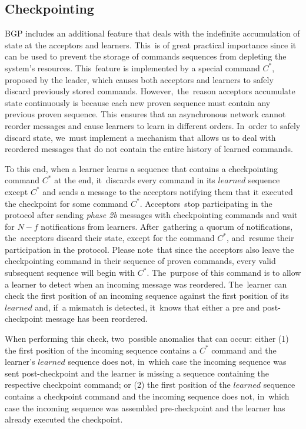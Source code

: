 \documentclass[algorithms,article,accept,moreauthors,pdftex,10pt,a4paper]{Definitions/mdpi}
\begin{document}
\subsection{Checkpointing} BGP includes an additional feature that deals with the indefinite accumulation of state at the acceptors and learners. This~is of great practical importance since it can be used to prevent the storage of commands sequences from depleting the system's resources. This~feature is implemented by a special command $C^*$, proposed by the leader, which causes both acceptors and learners to safely discard previously stored commands. However,~the~reason acceptors accumulate state continuously is because each new proven sequence must contain any previous proven sequence. This~ensures that an asynchronous network cannot reorder messages and cause learners to learn in different orders. In~order to safely discard state, we~must implement a mechanism that allows us to deal with reordered messages that do not contain the entire history of learned commands.\par
To this end, when a learner learns a sequence that contains a checkpointing command $C^*$ at the end, it~discards every command in its $learned$ sequence except $C^*$ and sends a message to the acceptors notifying them that it executed the checkpoint for some command $C^*$. Acceptors~stop participating in the protocol after sending \textit{phase 2b} messages with checkpointing commands and wait for $N-f$ notifications from learners. After~gathering a quorum of notifications, the~acceptors discard their state, except for the command $C^*$, and~resume their participation in the protocol. Please note~that since the acceptors also leave the checkpointing command in their sequence of proven commands, every valid subsequent sequence will begin with $C^*$. The~purpose of this command is to allow a learner to detect when an incoming message was reordered. The~learner can check the first position of an incoming sequence against the first position of its $learned$ and, if~a mismatch is detected, it~knows that either a pre and post-checkpoint message has been reordered. \par
When performing this check, two~possible anomalies that can occur: either (1) the first position of the incoming sequence contains a $C^*$ command and the learner's $learned$ sequence does not, in~which case the incoming sequence was sent post-checkpoint and the learner is missing a sequence containing the respective checkpoint command; or (2) the first position of the $learned$ sequence contains a checkpoint command and the incoming sequence does not, in~which case the incoming sequence was assembled pre-checkpoint and the learner has already executed the checkpoint. \par
\end{document}
